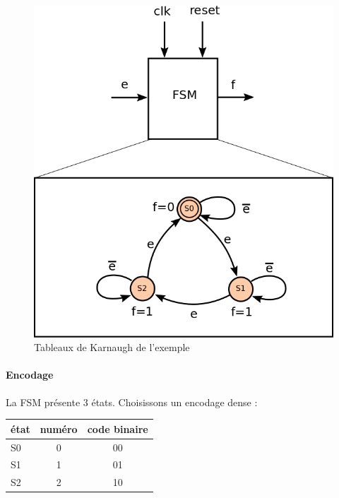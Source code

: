 \begin{figure}[h]
  \centering
  \includegraphics[scale=0.4]{./figures/exo_fsm.png}
  \caption{Tableaux de Karnaugh de l'exemple}
  \label{fig:karnaugh}
\end{figure}

\paragraph{Encodage}
La FSM présente 3 états. Choisissons un encodage dense :
\begin{table}[!htbp]
  \centering
  \begin{tabular}{|l|c|c|}
        \hline
        état  & numéro & code binaire  \\ \hline \hline
        S0  & 0       & 00           \\ \hline
        S1  & 1       & 01           \\ \hline
        S2  & 2       & 10           \\ \hline
    \end{tabular}
\end{table}

